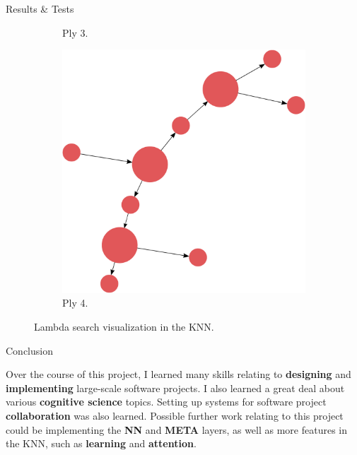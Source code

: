 \documentclass[final]{beamer} %
\begin{document}
\begin{frame}
\begin{columns}
\begin{column}{.33\textwidth}
{\begin{block}{Results \& Tests}
\begin{figure}[!htb]
\begin{subfigure}[!htb]{0.19\columnwidth}
							\caption{Ply 3.}
						\end{subfigure}
						\begin{subfigure}[!htb]{0.19\columnwidth}
							\centering
							\includegraphics[width=\columnwidth]{figures/knn_simple_lambda_think_4.pdf}
							\caption{Ply 4.}
						\end{subfigure}
						\caption{Lambda search visualization in the KNN.}
						\label{fig:lambda_search_test}
					\end{figure}
				
				\end{block}
				\begin{block}{Conclusion}
					\parbox{0.99\textwidth}{
						Over the course of this project, I learned many skills relating to \textbf{designing} and \textbf{implementing} large-scale software projects. I also learned a great deal about various \textbf{cognitive science} topics. Setting up systems for software project \textbf{collaboration} was also learned. Possible further work relating to this project could be implementing the \textbf{NN} and \textbf{META} layers, as well as more features in the KNN, such as \textbf{learning} and \textbf{attention}.}
				\end{block}
			}
			\end{column}
		\end{columns}
	\end{frame}
\end{document}
